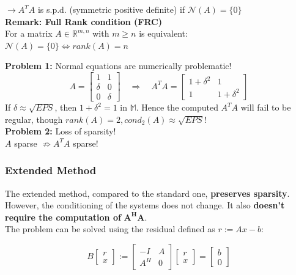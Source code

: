 \documentclass[12pt, a4paper]{article}
\newcommand{\R}{\mathbb{R}}
\newcommand{\M}{\mathbb{M}}
\begin{document}
$\rightarrow A^TA$ is \color{blue}s.p.d. (symmetric positive definite) \color{black} if $\mathcal{N}(A) = \lbrace 0 \rbrace$ \\

\textbf{Remark: Full Rank condition (FRC)} \\
For a matrix $A \in \R^{m,n}$ with $m \geq n$ is equivalent: \quad $\mathcal{N}(A) = \lbrace 0 \rbrace \Leftrightarrow rank(A)=n$ \\

\begin{tcolorbox}
\color{red}\textbf{Problem 1:} Normal equations are numerically problematic! \\

\[ 
	A = 
	\begin{bmatrix}
	1 & 1 \\ 
	\delta & 0 \\
	0 & \delta	
	\end{bmatrix}
	\quad
	\Rightarrow
	\quad
	A^TA = 
	\begin{bmatrix}
	1 + \delta^2 & 1 \\
	1 & 1 + \delta^2 	
	\end{bmatrix}
\] 
If $\delta \approx \sqrt{EPS}$, then $1 + \delta^2 = 1$ in $\M$. Hence the computed $A^TA$ will fail to be regular, though $rank(A) = 2, cond_2(A) \approx \sqrt{EPS}$! \hspace{3mm}\\

\textbf{Problem 2:} Loss of sparsity! \\
$A$ sparse $\not \Rightarrow A^TA$  sparse!
\end{tcolorbox}



\subsubsection{Extended Method}

The extended method, compared to the standard one, \textbf{preserves sparsity}. However, the conditioning of the systems does not change. It also \textbf{doesn't require the computation of} $\mathbf{A^HA}$. \\

The problem can be solved using the residual defined as $r := Ax - b$:

\begin{equation*}
	B\begin{bmatrix}r \\ x \end{bmatrix} := \begin{bmatrix}
		-I & A \\ A^H & 0
	\end{bmatrix} \begin{bmatrix}
		r \\ x
	\end{bmatrix} = \begin{bmatrix}
		b \\ 0
	\end{bmatrix}
\end{equation*}
\end{document}
